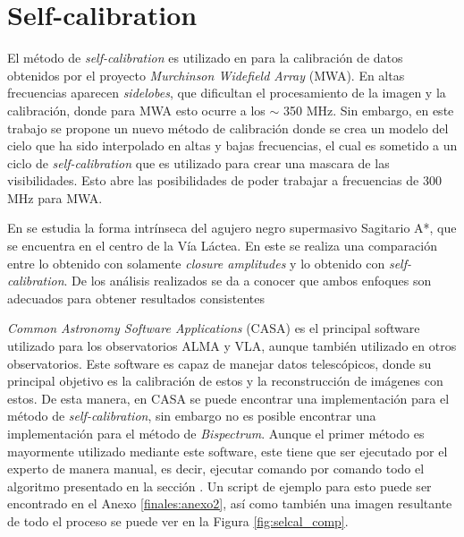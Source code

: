 \section{Self-calibration}

El método de \textit{self-calibration} es utilizado en \citet{cook_seymour_sokolowski_2021} para la calibración de datos obtenidos por el proyecto \textit{Murchinson Widefield Array} (MWA). En altas frecuencias aparecen \textit{sidelobes}, que dificultan el procesamiento de la imagen y la calibración, donde para MWA esto ocurre a los $\sim$ 350 MHz. Sin embargo, en este trabajo se propone un nuevo método de calibración donde se crea un modelo del cielo que ha sido interpolado en altas y bajas frecuencias, el cual es sometido a un ciclo de \textit{self-calibration} que es utilizado para crear una mascara de las visibilidades. Esto abre las posibilidades de poder trabajar a frecuencias de 300 MHz para MWA. 

En \citet{ortiz} se estudia la forma intrínseca del agujero negro supermasivo Sagitario A*, que se encuentra en el centro de la Vía Láctea. En este se realiza una comparación entre lo obtenido con solamente \textit{closure amplitudes} y lo obtenido con \textit{self-calibration}. De los análisis realizados se da a conocer que ambos enfoques son adecuados para obtener resultados consistentes 

\textit{Common Astronomy Software Applications} (CASA) \citep{bean2022casa} es el principal software utilizado para los observatorios ALMA y VLA, aunque también utilizado en otros observatorios. Este software es capaz de manejar datos telescópicos, donde su principal objetivo es la calibración de estos y la reconstrucción de imágenes con estos. De esta manera, en CASA se puede encontrar una implementación para el método de \textit{self-calibration}, sin embargo no es posible encontrar una implementación para el método de \textit{Bispectrum}. Aunque el primer método es mayormente utilizado mediante este software, este tiene que ser ejecutado por el experto de manera manual, es decir, ejecutar comando por comando todo el algoritmo presentado en la sección . Un script de ejemplo para esto puede ser encontrado en el Anexo \ref{finales:anexo2}, así como también una imagen resultante de todo el proceso se puede ver en la Figura \ref{fig:selcal_comp}.

